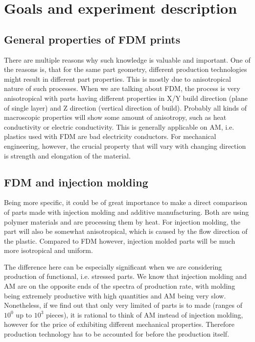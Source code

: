 \documentclass[a4paper, 11pt, reqno]{report}
\begin{document}
\section{Goals and experiment description}
%
\subsection{General properties of FDM prints}
There are multiple reasons why such knowledge is valuable and important. One of the reasons is, that for the same part geometry, different production technologies might result in different part properties. This is mostly due to anisotropical nature of such processes. When we are talking about FDM, the process is very anisotropical with parts having different properties in X/Y build direction (plane of single layer) and Z direction (vertical direction of build). Probably all kinds of macroscopic properties will show some amount of anisotropy, such as heat conductivity or electric conductivity. This is generally applicable on AM, i.e. plastics used with FDM are bad electricity conductors. For mechanical engineering, however, the crucial property that will vary with changing direction is strength and elongation of the material.
%
\subsection{FDM and injection molding}
Being more specific, it could be of great importance to make a direct comparison of parts  made with injection molding and additive manufacturing. Both are using polymer materials and are processing them by heat. For injection molding, the part will also be somewhat anisotropical, which is caused by the flow direction of the plastic. Compared to FDM however, injection molded parts will be much more isotropical and uniform.

	The difference here can be especially significant when we are considering production of functional, i.e. stressed parts. We know that injection molding and AM are on the opposite ends of the spectra of production rate, with molding being extremely productive with high quantities and AM being very slow. Nonetheless, if we find out that only very limited of parts is to made (ranges of $10^0$ up to $10^3$ pieces), it is rational to think of AM instead of injection molding, however for the price of exhibiting different mechanical properties. Therefore production technology has to be accounted for before the production itself.
\newpage


%
%
%
\end{document}

